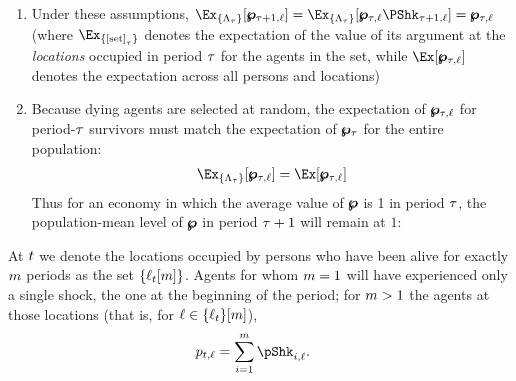 \documentclass[\econtexRoot/BufferStockTheory.tex]{subfiles}
\begin{document}
\begin{enumerate}
  
\item Under these assumptions, $\Ex_{\{\Liv_{\tAbs}\}}[\pLev_{\tAbs+1,\posn}]=\Ex_{\{\Liv_{\tAbs}\}}[\pLev_{\tAbs,\posn}\PShk_{\tAbs+1,\posn}]=\pLev_{\tAbs,\posn}$ (where $\Ex_{\{\text{[set]}_{\tAbs}\}}$ denotes the expectation of the value of its argument at the \emph{locations} occupied in period $\tau$ for the agents in the set, while  $\Ex[\pLev_{\tAbs,\posn}]$ denotes the expectation across all persons and locations)      
\item Because dying agents are selected at random, the expectation of $\pmb{\wp}_{\tau,\ell}$ for period-$\tau$ survivors must match the expectation of $\pmb{\wp}_{\tau}$ for the entire population:
  \begin{equation}\begin{gathered}\begin{aligned}
    \Ex_{\{\Liv_{\tAbs}\}}[\pLev_{\tAbs,\posn}]=\Ex[\pLev_{\tAbs,\posn}] \label{eq:pLevLivIsOne}
  \end{aligned}\end{gathered}\end{equation}
  Thus for an economy in which the average value of $\pmb{\wp}$ is 1 in period $\tau$, the population-mean level of $\pmb{\wp}$ in period $\tau+1$ will remain at $1$:
  
\end{enumerate}
At ${}t$ we denote the locations occupied by persons who have been alive for exactly $m$ periods as the set $\{\ell_{{}t}[m]\}$. Agents for whom $m=1$ will have experienced only a single shock, the one at the beginning of the period; for $m>1$ the agents at those locations (that is, for $\ell \in \{\ell_{{}t}\}[m]$),
\begin{equation}\begin{gathered}\begin{aligned}
  \pLog_{{\tp}\FutPer,\posn}  & = \sum_{\NewPer=1}^{\LooPer}\pShk_{{\tp}\NewPer,\posn}.
\end{aligned}\end{gathered}\end{equation}
\end{document}
